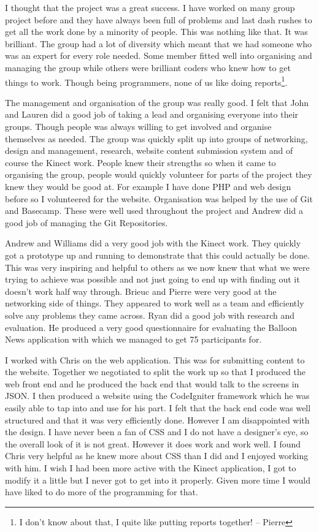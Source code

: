I thought that the project was a great success. I have worked on many group project before and they have always been full of problems and last dash rushes to get all the work done by a minority of people. This was nothing like that. It was brilliant. 
The group had a lot of diversity which meant that we had someone who was an expert for every role needed. Some member fitted well into organising and managing the group while others were brilliant coders who knew how to get things to work. Though being programmers, none of us like doing reports\footnote{I don't know about that, I quite like putting reports together! -- Pierre}. 

The management and organisation of the group was really good. I felt that John and Lauren did a good job of taking a lead and organising everyone into their groups. Though people was always willing to get involved and organise themselves as needed. The group was quickly split up into groups of networking, design and management, research, website content submission system and of course the Kinect work. People knew their strengths so when it came to organising the group, people would quickly volunteer for parts of the project they knew they would be good at. For example I have done PHP and web design before so I volunteered for the website. Organisation was helped by the use of Git and Basecamp. These were well used throughout the project and Andrew did a good job of managing the Git Repositories.

Andrew and Williams did a very good job with the Kinect work. They quickly got a prototype up and running to demonstrate that this could actually be done. This was very inspiring and helpful to others as we now knew that what we were trying to achieve was possible and not just going to end up with finding out it doesn't work half way through. Brieuc and Pierre were very good at the networking side of things. They appeared to work well as a team and efficiently solve any problems they came across. Ryan did a good job with research and evaluation. He produced a very good questionnaire for evaluating the Balloon News application with which we managed to get 75 participants for.

I worked with Chris on the web application. This was for submitting content to the website. Together we negotiated to split the work up so that I produced the web front end and he produced the back end that would talk to the screens in JSON. I then produced a website using the CodeIgniter framework which he was easily able to tap into and use for his part. I felt that the back end code was well structured and that it was very efficiently done. However I am disappointed with the design. I have never been a fan of CSS and I do not have a designer's eye, so the overall look of it is not great. However it does work and work well. I found Chris very helpful as he knew more about CSS than I did and I enjoyed working with him. I wish I had been more active with the Kinect application, I got to modify it a little but I never got to get into it properly. Given more time I would have liked to do more of the programming for that.

